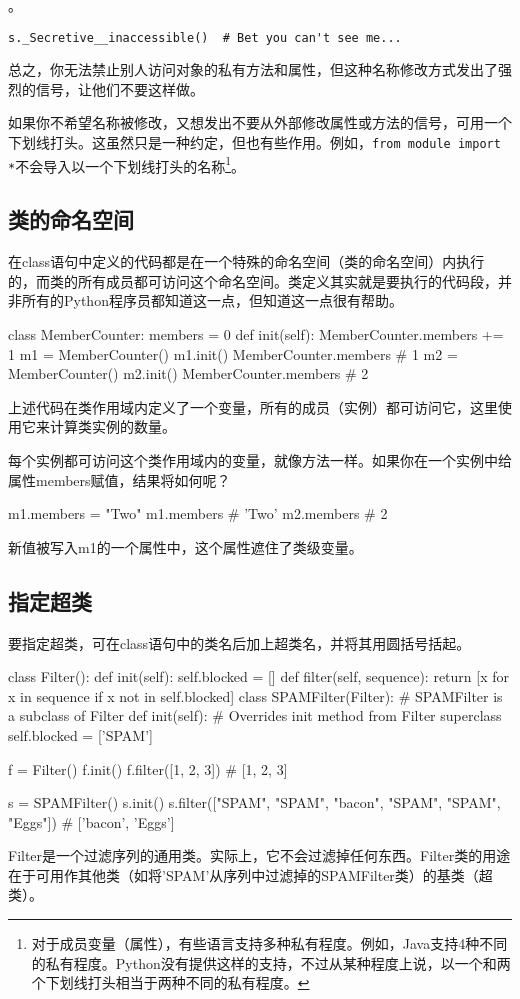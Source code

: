 。

\verb|s._Secretive__inaccessible()  # Bet you can't see me...|

总之，你无法禁止别人访问对象的私有方法和属性，但这种名称修改方式发出了强烈的信号，让他们不要这样做。

如果你不希望名称被修改，又想发出不要从外部修改属性或方法的信号，可用一个下划线打头。这虽然只是一种约定，但也有些作用。例如，\verb|from module import *|不会导入以一个下划线打头的名称\footnote{对于成员变量（属性），有些语言支持多种私有程度。例如，Java支持4种不同的私有程度。Python没有提供这样的支持，不过从某种程度上说，以一个和两个下划线打头相当于两种不同的私有程度。}。

\subsection{类的命名空间}
在class语句中定义的代码都是在一个特殊的命名空间（类的命名空间）内执行的，而类的所有成员都可访问这个命名空间。类定义其实就是要执行的代码段，并非所有的Python程序员都知道这一点，但知道这一点很有帮助。

\begin{pyc}
class MemberCounter:
    members = 0
    def init(self):
        MemberCounter.members += 1
m1 = MemberCounter()
m1.init()
MemberCounter.members  # 1
m2 = MemberCounter()
m2.init()
MemberCounter.members  # 2
\end{pyc}
上述代码在类作用域内定义了一个变量，所有的成员（实例）都可访问它，这里使用它来计算类实例的数量。

每个实例都可访问这个类作用域内的变量，就像方法一样。如果你在一个实例中给属性members赋值，结果将如何呢？
\begin{pyc}
m1.members = "Two"
m1.members  # 'Two'
m2.members  # 2
\end{pyc}
新值被写入m1的一个属性中，这个属性遮住了类级变量。
\subsection{指定超类}
要指定超类，可在class语句中的类名后加上超类名，并将其用圆括号括起。
\begin{pyc}
class Filter():
    def init(self):
        self.blocked = []
    def filter(self, sequence):
        return [x for x in sequence if x not in self.blocked]
class SPAMFilter(Filter):  # SPAMFilter is a subclass of Filter
    def init(self):  # Overrides init method from Filter superclass
        self.blocked = ['SPAM']

f = Filter()
f.init()
f.filter([1, 2, 3])  # [1, 2, 3]

s = SPAMFilter()
s.init()
s.filter(["SPAM", "SPAM", "bacon", "SPAM", "SPAM", "Eggs"])
# ['bacon', 'Eggs']
\end{pyc}
Filter是一个过滤序列的通用类。实际上，它不会过滤掉任何东西。Filter类的用途在于可用作其他类（如将'SPAM'从序列中过滤掉的SPAMFilter类）的基类（超类）。

